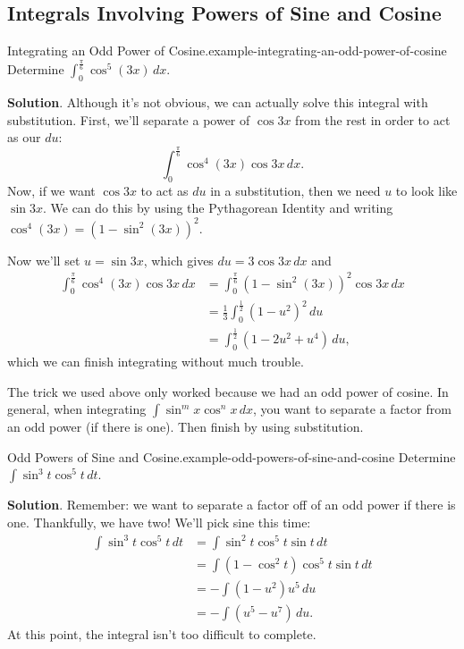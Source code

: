 \documentclass[10pt,]{book}
\numberwithin{equation}{section}
\begin{document}
\subsection[{Integrals Involving Powers of Sine and Cosine}]{Integrals Involving Powers of Sine and Cosine}\label{subsection-integrals-involving-powers-of-sine-and-cosine}
\begin{example}{Integrating an Odd Power of Cosine.}{example-integrating-an-odd-power-of-cosine}%
\hypertarget{p-520}{}%
Determine \(\int_{0}^{\frac{\pi}{6}}\cos^{5}(3x)\,dx\).%
\par\smallskip%
\noindent\textbf{Solution}.\hypertarget{solution-114}{}\quad%
\hypertarget{p-521}{}%
Although it's not obvious, we can actually solve this integral with substitution. First, we'll separate a power of \(\cos3x\) from the rest in order to act as our \(du\):%
\begin{equation*}
\int_{0}^{\frac{\pi}{6}}\cos^{4}(3x)\cos3x\,dx.
\end{equation*}
Now, if we want \(\cos3x\) to act as \(du\) in a substitution, then we need \(u\) to look like \(\sin3x\). We can do this by using the Pythagorean Identity and writing \(\cos^{4}(3x) = (1 - \sin^{2}(3x))^{2}\).%
\par
\hypertarget{p-522}{}%
Now we'll set \(u = \sin3x\), which gives \(du = 3\cos3x\,dx\) and%
%
\begin{align*}
\int_{0}^{\frac{\pi}{6}}\cos^{4}(3x)\cos3x\,dx & = \int_{0}^{\frac{\pi}{6}}(1-\sin^{2}(3x))^{2}\cos3x\,dx \\
& = \frac{1}{3}\int_{0}^{\frac{1}{2}}(1 - u^{2})^{2}\,du \\
& = \int_{0}^{\frac{1}{2}}(1 - 2u^{2} + u^{4})\,du, 
\end{align*}
\hypertarget{p-523}{}%
which we can finish integrating without much trouble.%
\end{example}
\hypertarget{p-524}{}%
The trick we used above only worked because we had an odd power of cosine. In general, when integrating \(\int\sin^{m}x\cos^{n}x\,dx\), you want to separate a factor from an odd power (if there is one). Then finish by using substitution.%
\begin{example}{Odd Powers of Sine and Cosine.}{example-odd-powers-of-sine-and-cosine}%
\hypertarget{p-525}{}%
Determine \(\int\sin^{3}t\cos^{5}t\,dt\).%
\par\smallskip%
\noindent\textbf{Solution}.\hypertarget{solution-115}{}\quad%
\hypertarget{p-526}{}%
Remember: we want to separate a factor off of an odd power if there is one. Thankfully, we have two! We'll pick sine this time:%
%
\begin{align*}
\int\sin^{3}t\cos^{5}t\,dt & = \int\sin^{2}t\cos^{5}t\sin t\,dt \\
& = \int(1 - \cos^{2}t)\cos^{5}t\sin t\,dt \\
& = -\int(1 - u^{2})u^{5}\,du \\
& = -\int (u^{5} - u^{7})\,du. 
\end{align*}
\hypertarget{p-527}{}%
At this point, the integral isn't too difficult to complete.%
\end{example}
\end{document}

